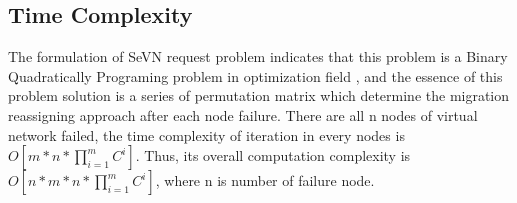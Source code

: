 
\subsection{Time Complexity}
The formulation of SeVN request problem indicates that this problem is a Binary Quadratically Programing problem in optimization field , and the essence of this problem solution is a series of permutation matrix  which determine the migration reassigning approach after each node failure. There are all n nodes of virtual network failed, the time complexity of iteration in every nodes is $O[m*n*\prod_{i=1}^{m}C^i]$. Thus, its overall computation complexity is $O[n*m*n*\prod_{i=1}^{m}C^i]$, where n is number of failure node.
